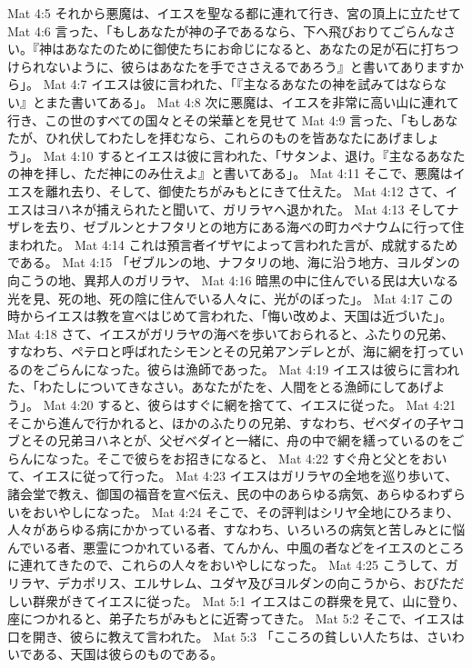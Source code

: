 Mat 4:5  それから悪魔は、イエスを聖なる都に連れて行き、宮の頂上に立たせて
Mat 4:6  言った、「もしあなたが神の子であるなら、下へ飛びおりてごらんなさい。『神はあなたのために御使たちにお命じになると、あなたの足が石に打ちつけられないように、彼らはあなたを手でささえるであろう』と書いてありますから」。
Mat 4:7  イエスは彼に言われた、「『主なるあなたの神を試みてはならない』とまた書いてある」。
Mat 4:8  次に悪魔は、イエスを非常に高い山に連れて行き、この世のすべての国々とその栄華とを見せて
Mat 4:9  言った、「もしあなたが、ひれ伏してわたしを拝むなら、これらのものを皆あなたにあげましょう」。
Mat 4:10  するとイエスは彼に言われた、「サタンよ、退け。『主なるあなたの神を拝し、ただ神にのみ仕えよ』と書いてある」。
Mat 4:11  そこで、悪魔はイエスを離れ去り、そして、御使たちがみもとにきて仕えた。
Mat 4:12  さて、イエスはヨハネが捕えられたと聞いて、ガリラヤへ退かれた。
Mat 4:13  そしてナザレを去り、ゼブルンとナフタリとの地方にある海べの町カペナウムに行って住まわれた。
Mat 4:14  これは預言者イザヤによって言われた言が、成就するためである。
Mat 4:15  「ゼブルンの地、ナフタリの地、海に沿う地方、ヨルダンの向こうの地、異邦人のガリラヤ、
Mat 4:16  暗黒の中に住んでいる民は大いなる光を見、死の地、死の陰に住んでいる人々に、光がのぼった」。
Mat 4:17  この時からイエスは教を宣べはじめて言われた、「悔い改めよ、天国は近づいた」。
Mat 4:18  さて、イエスがガリラヤの海べを歩いておられると、ふたりの兄弟、すなわち、ペテロと呼ばれたシモンとその兄弟アンデレとが、海に網を打っているのをごらんになった。彼らは漁師であった。
Mat 4:19  イエスは彼らに言われた、「わたしについてきなさい。あなたがたを、人間をとる漁師にしてあげよう」。
Mat 4:20  すると、彼らはすぐに網を捨てて、イエスに従った。
Mat 4:21  そこから進んで行かれると、ほかのふたりの兄弟、すなわち、ゼベダイの子ヤコブとその兄弟ヨハネとが、父ゼベダイと一緒に、舟の中で網を繕っているのをごらんになった。そこで彼らをお招きになると、
Mat 4:22  すぐ舟と父とをおいて、イエスに従って行った。
Mat 4:23  イエスはガリラヤの全地を巡り歩いて、諸会堂で教え、御国の福音を宣べ伝え、民の中のあらゆる病気、あらゆるわずらいをおいやしになった。
Mat 4:24  そこで、その評判はシリヤ全地にひろまり、人々があらゆる病にかかっている者、すなわち、いろいろの病気と苦しみとに悩んでいる者、悪霊につかれている者、てんかん、中風の者などをイエスのところに連れてきたので、これらの人々をおいやしになった。
Mat 4:25  こうして、ガリラヤ、デカポリス、エルサレム、ユダヤ及びヨルダンの向こうから、おびただしい群衆がきてイエスに従った。
Mat 5:1  イエスはこの群衆を見て、山に登り、座につかれると、弟子たちがみもとに近寄ってきた。
Mat 5:2  そこで、イエスは口を開き、彼らに教えて言われた。
Mat 5:3  「こころの貧しい人たちは、さいわいである、天国は彼らのものである。
